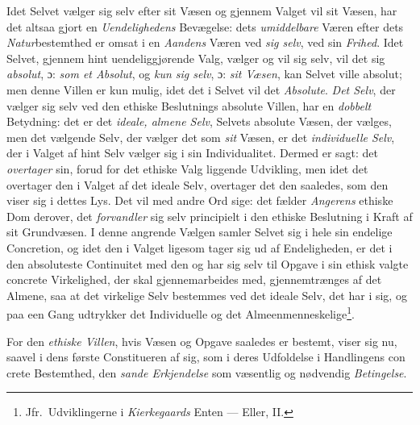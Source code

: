 Idet Selvet vælger sig selv efter sit Væsen og gjennem Valget vil sit Væsen, har
det altsaa gjort en \emph{Uendelighedens} Bevægelse: dets \emph{umiddelbare}
Væren efter dets \emph{Natur}bestemthed er omsat i en \emph{Aandens} Væren ved
\emph{sig selv}, ved sin \emph{Frihed}.
Idet Selvet, gjennem hint uendeliggjørende Valg, vælger og vil sig selv, vil det
sig \emph{absolut}, ɔ: \emph{som et Absolut}, og \emph{kun sig selv}, ɔ:
\emph{sit Væsen}, kan Selvet ville absolut; men denne Villen er kun mulig, idet
det i Selvet vil det \emph{Absolute}. \emph{Det Selv}, der vælger sig selv ved
den ethiske Beslutnings absolute Villen, har en \emph{dobbelt} Betydning: det er
det \emph{ideale, almene Selv}, Selvets absolute Væsen, der vælges, men det
vælgende Selv, der vælger det som \emph{sit} Væsen, er det \emph{individuelle
Selv}, der i Valget af hint Selv vælger sig i sin Individualitet. Dermed er
sagt: det \emph{overtager} sin, forud for det ethiske Valg liggende Udvikling,
men idet det overtager den i Valget af det ideale Selv, overtager det den
saaledes, som den viser sig i dettes Lys. Det vil med andre Ord sige: det fælder
\emph{Angerens} ethiske Dom derover, det \emph{forvandler} sig selv principielt
i den ethiske Beslutning i Kraft af sit Grundvæsen. I denne angrende Vælgen
samler Selvet sig i hele sin endelige Concretion, og idet den i Valget ligesom
tager sig ud af Endeligheden, er det i den absoluteste Continuitet med den og
har sig selv til Opgave i sin ethisk valgte concrete Virkelighed, der skal
gjennemarbeides med, gjennemtrænges af det Almene, saa at det virkelige Selv
bestemmes ved det ideale Selv, det har i sig, og paa een Gang udtrykker det
Individuelle og det Almeenmenneskelige\footnote{Jfr.\ Udviklingerne i
\emph{Kierkegaards} Enten --- Eller, II.}.

For den \emph{ethiske Villen}, hvis Væsen og Opgave saaledes er bestemt, viser
sig nu, saavel i dens første Constitueren af sig, som i deres Udfoldelse i
Handlingens con%
crete Bestemthed, den \emph{sande Erkjendelse} som væsentlig og nødvendig
\emph{Betingelse}.

